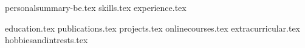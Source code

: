 \documentclass[12pt, a4paper]{awesome-cv}
\newcommand*{\sectiondir}{resume/}
\begin{document}
\makecvheader

{personalsummary-be.tex}
{skills.tex}
{experience.tex}
\pagebreak

{education.tex}
{publications.tex}
{projects.tex}
{onlinecourses.tex}
{extracurricular.tex}
{hobbiesandintrests.tex}
\end{document}
